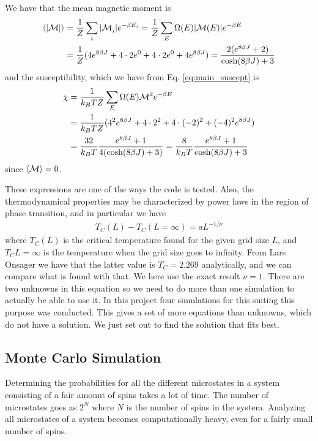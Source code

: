 \documentclass[11pt, a4paper]{article}
\begin{document}
We have that the mean magnetic moment is
\begin{gather}
\begin{aligned}
\braket{|\cal M|} &= \frac{1}{Z}\sum\limits_{i}{|\cal M}_i|e^{-\beta E_i} = \frac{1}{Z}\sum\limits_{E}\Omega(E)|{\cal M}(E)|e^{-\beta E}\\
 &= \frac{1}{Z}(4e^{8\beta J} + 4\cdot2e^0 + 4\cdot2e^0 + 4e^{8\beta J}) = \frac{2(e^{8\beta J} +2)}{\cosh(8\beta J) + 3}
 \end{aligned}
\end{gather}
and the susceptibility, which we have from Eq. \eqref{eq:main_suscept} is
\begin{gather}
\begin{aligned}
\chi &= \frac{1}{k_BTZ}\sum\limits_E \Omega(E){\cal M}^2e^{-\beta E}\\
 &= \frac{1}{k_BTZ}(4^2e^{8\beta J} + 4\cdot2^2 + 4\cdot(-2)^2 + (-4)^2e^{8\beta J})\\
 &= \frac{32}{k_BT}\frac{e^{8\beta J}+1}{4(\cosh(8\beta J) + 3)} = \frac{8}{k_BT}\frac{e^{8\beta J}+1}{\cosh(8\beta J) + 3}
 \end{aligned}
\end{gather}
since $\braket{\cal M} = 0$.

These expressions are one of the ways the code is tested. Also, the thermodynamical properties may be characterized by power laws in the region of phase transition, and in particular we have
\begin{gather}
T_C(L)-T_C(L=\infty) = aL^{-1/\nu} 
\label{eq:powerlaw}
\end{gather} 
where $T_C(L)$ is the critical temperature found for the given grid size $L$, and $T_C{L=\infty}$ is the temperature when the grid size goes to infinity. From Lars Onsager we have that the latter value is $T_C=2.269$ analytically, and we can compare what is found with that. We here use the exact result $\nu=1$. There are two unknowns in this equation so we need to do more than one simulation to actually be able to use it. In this project four simulations for this suiting this purpose was conducted. This gives a set of more equations than unknowns, which do not have a solution. We just set out to find the solution that fits best.

\subsection{Monte Carlo Simulation}
Determining the probabilities for all the different microstates in a system consisting of a fair amount of spins takes a lot of time. The number of microstates goes as $2^N$ where $N$ is the number of spins in the system. Analyzing all microstates of a system becomes computationally heavy, even for a fairly small number of spins.
\end{document}
